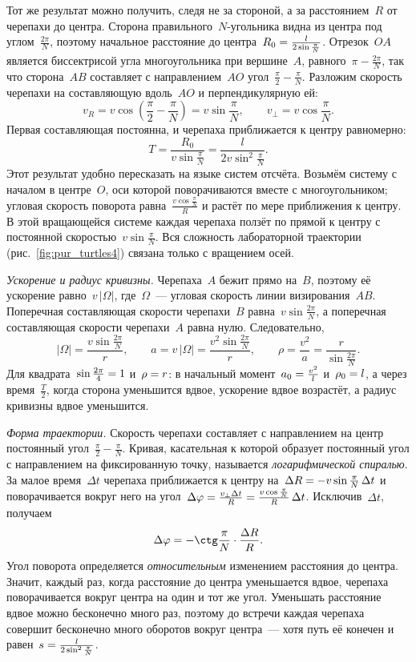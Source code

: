 \documentclass[../main.tex]{subfiles}
\begin{document}
\begin{example}
Тот же результат можно получить, следя не за стороной, а за расстоянием~$R$ от
черепахи до центра. Сторона правильного~$N$-угольника видна из центра под углом~$\frac{2\pi}{N}$, поэтому начальное расстояние до центра~$R_0 \hm= \frac{l}{2\sin\frac{\pi}{N}}$. Отрезок~$OA$ является биссектрисой угла
многоугольника при вершине~$A$, равного~$\pi - \frac{2\pi}{N}$, так что сторона~$AB$
составляет с направлением~$AO$ угол~$\frac{\pi}{2} - \frac{\pi}{N}$. Разложим скорость
черепахи на составляющую вдоль~$AO$ и перпендикулярную ей:
\[
v_R = v\cos\left(\frac{\pi}{2} - \frac{\pi}{N}\right) = v\sin\frac{\pi}{N},
\qquad
v_\perp = v\cos\frac{\pi}{N}.
\]
Первая составляющая постоянна, и черепаха приближается к центру равномерно:
\[
T = \frac{R_0}{v\sin\frac{\pi}{N}} = \frac{l}{2v\sin^2\frac{\pi}{N}}.
\]
Этот результат удобно пересказать на языке систем отсчёта. Возьмём систему с началом
в центре~$O$, оси которой поворачиваются вместе с многоугольником; угловая скорость
поворота равна~$\frac{v\cos\frac{\pi}{N}}{R}$ и растёт по мере приближения к центру. В
этой вращающейся системе каждая черепаха ползёт по прямой к центру с постоянной
скоростью~$v\sin\frac{\pi}{N}$. Вся сложность лабораторной траектории
(рис.~\ref{fig:pur_turtles4}) связана только с вращением осей.

\noindent\textit{Ускорение и радиус кривизны.} Черепаха~$A$ бежит прямо на~$B$,
поэтому её ускорение равно~$v\,|\Omega|$, где~$\Omega$~--- угловая скорость линии
визирования~$AB$. Поперечная составляющая скорости черепахи~$B$ равна~$v\sin\frac{2\pi}{N}$, а поперечная составляющая скорости черепахи~$A$ равна нулю.
Следовательно,
\[
|\Omega| = \frac{v\sin\frac{2\pi}{N}}{r},
\qquad
a = v\,|\Omega| = \frac{v^2\sin\frac{2\pi}{N}}{r},
\qquad
\rho = \frac{v^2}{a} = \frac{r}{\sin\frac{2\pi}{N}}.
\]
Для квадрата~$\sin\frac{2\pi}{4} \hm= 1$ и~$\rho \hm= r$: в начальный момент~$a_0 \hm= \frac{v^2}{l}$
и~$\rho_0 \hm= l$, а через время~$\frac{T}{2}$, когда сторона уменьшится вдвое, ускорение
вдвое возрастёт, а радиус кривизны вдвое уменьшится.

\noindent\textit{Форма траектории.} Скорость черепахи составляет с направлением на
центр постоянный угол~$\frac{\pi}{2} - \frac{\pi}{N}$. Кривая, касательная к которой
образует постоянный угол с направлением на фиксированную точку, называется
\textit{логарифмической спиралью}. За малое время~$\Delta t$ черепаха приближается к
центру на~$\Delta R \hm= -v\sin\frac{\pi}{N}\,\Delta t$ и поворачивается вокруг него на
угол~$\Delta\varphi \hm= \frac{v_\perp\Delta t}{R} \hm= \frac{v\cos\frac{\pi}{N}}{R}\,\Delta t$.
Исключив~$\Delta t$, получаем
\[
\Delta\varphi = -\ctg\frac{\pi}{N}\cdot\frac{\Delta R}{R}.
\]
Угол поворота определяется \emph{относительным} изменением расстояния до центра.
Значит, каждый раз, когда расстояние до центра уменьшается вдвое, черепаха
поворачивается вокруг центра на один и тот же угол. Уменьшать расстояние вдвое можно
бесконечно много раз, поэтому до встречи каждая черепаха совершит бесконечно много
оборотов вокруг центра~--- хотя путь её конечен и равен~$s \hm= \frac{l}{2\sin^2\frac{\pi}{N}}$.


\end{example}
\end{document}
